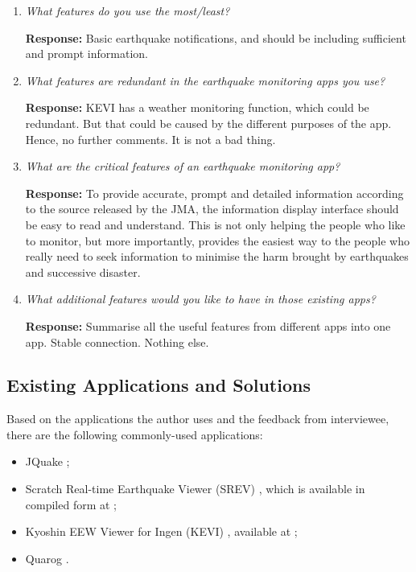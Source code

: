 \begin{enumerate}
    \item \textit{What features do you use the most/least?}

          \textbf{Response:} Basic earthquake notifications, and should be including sufficient and prompt information.

    \item \textit{What features are redundant in the earthquake monitoring apps you use?}

          \textbf{Response:} KEVI has a weather monitoring function, which could be redundant. But that could be caused by the different purposes of the app. Hence, no further comments. It is not a bad thing.

    \item \textit{What are the critical features of an earthquake monitoring app?}

          \textbf{Response:} To provide accurate, prompt and detailed information according to the source released by the JMA, the information display interface should be easy to read and understand. This is not only helping the people who like to monitor, but more importantly, provides the easiest way to the people who really need to seek information to minimise the harm brought by earthquakes and successive disaster.

    \item \textit{What additional features would you like to have in those existing apps?}

          \textbf{Response:} Summarise all the useful features from different apps into one app. Stable connection. Nothing else.
\end{enumerate}

\subsection{Existing Applications and Solutions}

Based on the applications the author uses and the feedback from interviewee, there are the following commonly-used applications:
\begin{itemize}
    \item JQuake \autocite{soft-jquake};
    \item Scratch Real-time Earthquake Viewer (SREV) \autocite{soft-srev}, which is available in compiled form at  \autocite{soft-srev-github};
    \item Kyoshin EEW Viewer for Ingen (KEVI) \autocite{soft-kevi}, available at  \autocite{soft-kevi-github};
    \item Quarog \autocite{soft-quarog}.
\end{itemize}

